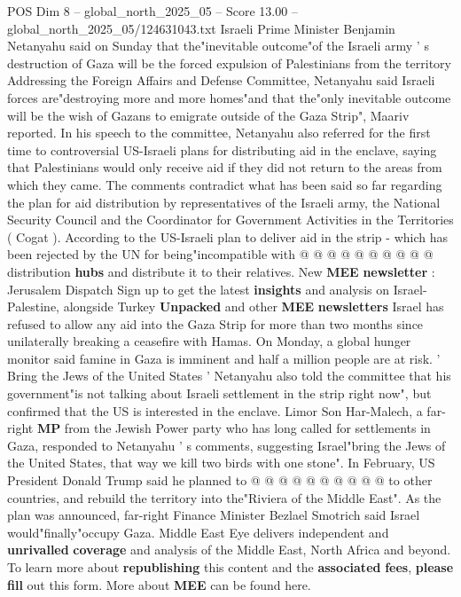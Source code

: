 \begin{textsample}{POS Dim 8 – global\_north\_2025\_05 – Score 13.00 – global\_north\_2025\_05/124631043.txt}  \label{ex:f8_pos_035}
Israeli Prime Minister Benjamin Netanyahu said on Sunday that the"inevitable outcome"of the Israeli army ' s destruction of Gaza will be the forced expulsion of Palestinians from the territory Addressing the Foreign Affairs and Defense Committee, Netanyahu said Israeli forces are"destroying more and more homes"and that the"only inevitable outcome will be the wish of Gazans to emigrate outside of the Gaza Strip", Maariv reported.
In his speech to the committee, Netanyahu also referred for the first time to controversial US-Israeli plans for distributing aid in the enclave, saying that Palestinians would only receive aid if they did not return to the areas from which they came.
The comments contradict what has been said so far regarding the plan for aid distribution by representatives of the Israeli army, the National Security Council and the Coordinator for Government Activities in the Territories ( Cogat ).
According to the US-Israeli plan to deliver aid in the strip - which has been rejected by the UN for being"incompatible with @ @ @ @ @ @ @ @ @ @ distribution \textbf{hubs} and distribute it to their relatives.
New \textbf{MEE} \textbf{newsletter} : Jerusalem Dispatch Sign up to get the latest \textbf{insights} and analysis on Israel-Palestine, alongside Turkey \textbf{Unpacked} and other \textbf{MEE} \textbf{newsletters} Israel has refused to allow any aid into the Gaza Strip for more than two months since unilaterally breaking a ceasefire with Hamas.
On Monday, a global hunger monitor said famine in Gaza is imminent and half a million people are at risk. ' Bring the Jews of the United States ' Netanyahu also told the committee that his government"is not talking about Israeli settlement in the strip right now", but confirmed that the US is interested in the enclave.
Limor Son Har-Malech, a far-right \textbf{MP} from the Jewish Power party who has long called for settlements in Gaza, responded to Netanyahu ' s comments, suggesting Israel"bring the Jews of the United States, that way we kill two birds with one stone".
In February, US President Donald Trump said he planned to @ @ @ @ @ @ @ @ @ @ to other countries, and rebuild the territory into the"Riviera of the Middle East".
As the plan was announced, far-right Finance Minister Bezlael Smotrich said Israel would"finally"occupy Gaza.
Middle East Eye delivers independent and \textbf{unrivalled} \textbf{coverage} and analysis of the Middle East, North Africa and beyond.
To learn more about \textbf{republishing} this content and the \textbf{associated} \textbf{fees}, \textbf{please} \textbf{fill} out this form.
More about \textbf{MEE} can be found here.

\end{textsample}
